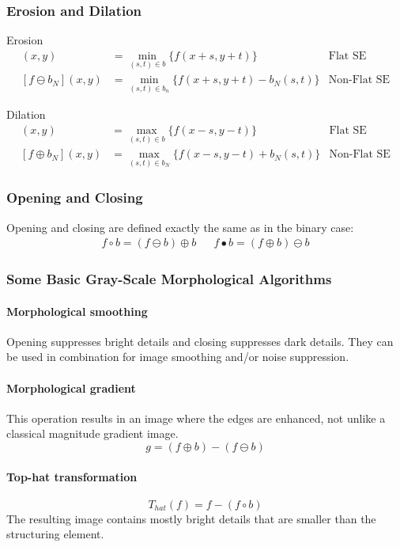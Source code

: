 \subsubsection{Erosion and Dilation}
Erosion
\begin{align*}
	[f\ominus b](x,y)	&= \min_{(s,t)\in b} \{f(x+s,y+t)\}				& \text{Flat SE} \\
	[f\ominus b_N](x,y)	&= \min_{(s,t)\in b_n} \{f(x+s,y+t) -b_N(s,t)\}	& \text{Non-Flat SE}
\end{align*}

Dilation
\begin{align*}
	[f\oplus b](x,y)	&= \max_{(s,t)\in b} \{f(x-s,y-t)\}				& \text{Flat SE} \\
	[f\oplus b_N](x,y)	&= \max_{(s,t)\in b_N} \{f(x-s,y-t) +b_N(s,t)\}	& \text{Non-Flat SE}
\end{align*}

\subsubsection{Opening and Closing}
Opening and closing are defined exactly the same as in the binary case:
\begin{align*}
	f \circ b = (f \ominus b) \oplus b &&
	f  \bullet b = (f \oplus b) \ominus b
\end{align*}

\subsubsection{Some Basic Gray-Scale Morphological Algorithms}
\paragraph{Morphological smoothing}
Opening suppresses bright details and closing suppresses dark details. They can be used in combination for image smoothing and/or noise suppression.
\paragraph{Morphological gradient}
This operation results in an image where the edges are enhanced, not unlike a classical magnitude gradient image.
\[
	g=(f\oplus b)-(f\ominus b)
\]
\paragraph{Top-hat transformation}
\[
	T_{hat}(f) = f -(f \circ b)
\]
The resulting image contains mostly bright details that are smaller than the structuring element.
